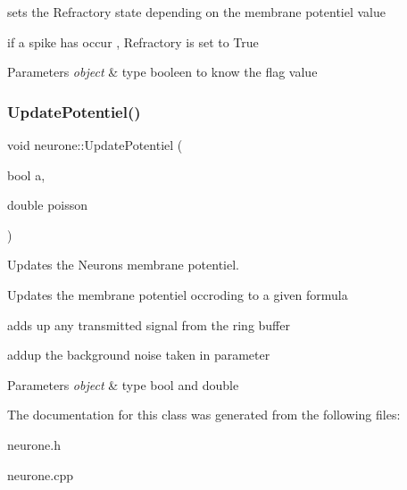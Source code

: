 sets the Refractory state depending on the membrane potentiel value

if a spike has occur , Refractory is set to True


\begin{DoxyParams}{Parameters}
{\em object} & type booleen to know the flag value \\
\hline
\end{DoxyParams}
\mbox{\label{classneurone_a82853256cf518a4539e3ead03d0a0bf6}} 
\subsubsection{\texorpdfstring{Update\+Potentiel()}{UpdatePotentiel()}}
{\footnotesize\ttfamily void neurone\+::\+Update\+Potentiel (\begin{DoxyParamCaption}\item[{bool}]{a,  }\item[{double}]{poisson }\end{DoxyParamCaption})}



Updates the Neuron\textquotesingle{}s membrane potentiel. 

Updates the membrane potentiel occroding to a given formula

add\textquotesingle{}s up any transmitted signal from the ring buffer

add\textquotesingle{}up the background noise taken in parameter


\begin{DoxyParams}{Parameters}
{\em object} & type bool and double \\
\hline
\end{DoxyParams}


The documentation for this class was generated from the following files\+:\begin{DoxyCompactItemize}
\item 
neurone.\+h\item 
neurone.\+cpp\end{DoxyCompactItemize}
